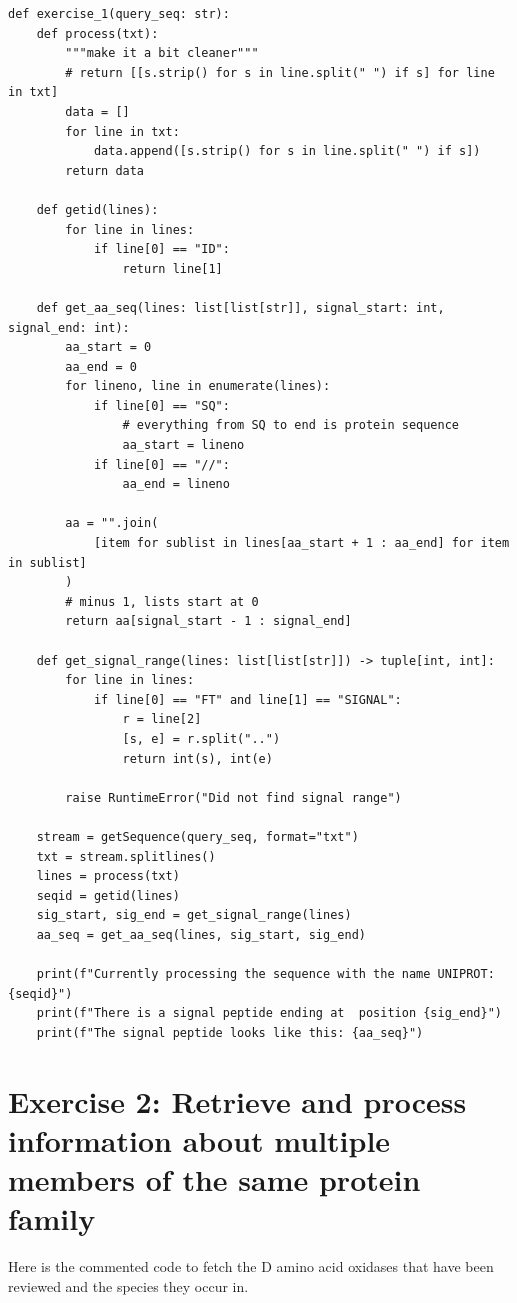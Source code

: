 \documentclass{article} %
\begin{document}
\begin{verbatim}
def exercise_1(query_seq: str):
    def process(txt):
        """make it a bit cleaner"""
        # return [[s.strip() for s in line.split(" ") if s] for line in txt]
        data = []
        for line in txt:
            data.append([s.strip() for s in line.split(" ") if s])
        return data

    def getid(lines):
        for line in lines:
            if line[0] == "ID":
                return line[1]

    def get_aa_seq(lines: list[list[str]], signal_start: int, signal_end: int):
        aa_start = 0
        aa_end = 0
        for lineno, line in enumerate(lines):
            if line[0] == "SQ":
                # everything from SQ to end is protein sequence
                aa_start = lineno
            if line[0] == "//":
                aa_end = lineno

        aa = "".join(
            [item for sublist in lines[aa_start + 1 : aa_end] for item in sublist]
        )
        # minus 1, lists start at 0
        return aa[signal_start - 1 : signal_end]

    def get_signal_range(lines: list[list[str]]) -> tuple[int, int]:
        for line in lines:
            if line[0] == "FT" and line[1] == "SIGNAL":
                r = line[2]
                [s, e] = r.split("..")
                return int(s), int(e)

        raise RuntimeError("Did not find signal range")

    stream = getSequence(query_seq, format="txt")
    txt = stream.splitlines()
    lines = process(txt)
    seqid = getid(lines)
    sig_start, sig_end = get_signal_range(lines)
    aa_seq = get_aa_seq(lines, sig_start, sig_end)

    print(f"Currently processing the sequence with the name UNIPROT:{seqid}")
    print(f"There is a signal peptide ending at  position {sig_end}")
    print(f"The signal peptide looks like this: {aa_seq}")
\end{verbatim}

\section{Exercise 2: Retrieve and process information about multiple members of the same protein family}

Here is the commented code to fetch the D amino acid oxidases that have been reviewed and the species they occur in.
\end{document}
